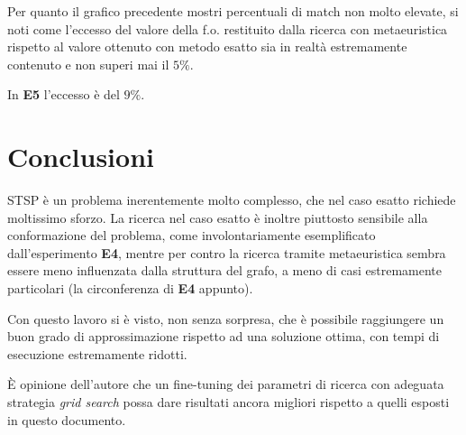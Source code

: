 \documentclass[a4paper]{article}
\begin{document}
                    Per quanto il grafico precedente mostri percentuali di match non molto elevate, si noti come l'eccesso del valore della f.o. restituito dalla ricerca con metaeuristica rispetto al valore
                    ottenuto con metodo esatto sia in realt\`a estremamente contenuto e non superi mai il $5\%$.

                    In \textbf{E5} l'eccesso \`e del $9\%$.

    \section{Conclusioni}
        STSP \`e un problema inerentemente molto complesso, che nel caso esatto richiede moltissimo sforzo.
        La ricerca nel caso esatto \`e inoltre piuttosto sensibile alla conformazione del problema, come involontariamente esemplificato
        dall'esperimento \textbf{E4}, mentre per contro la ricerca tramite metaeuristica sembra essere meno influenzata dalla struttura del grafo,
        a meno di casi estremamente particolari (la circonferenza di \textbf{E4} appunto).

        Con questo lavoro si \`e visto, non senza sorpresa, che \`e possibile raggiungere un buon grado di approssimazione rispetto ad una
        soluzione ottima, con tempi di esecuzione estremamente ridotti.

        \`E opinione dell'autore che un fine-tuning dei parametri di ricerca con adeguata strategia \emph{grid search} possa dare risultati
        ancora migliori rispetto a quelli esposti in questo documento.
\end{document}
